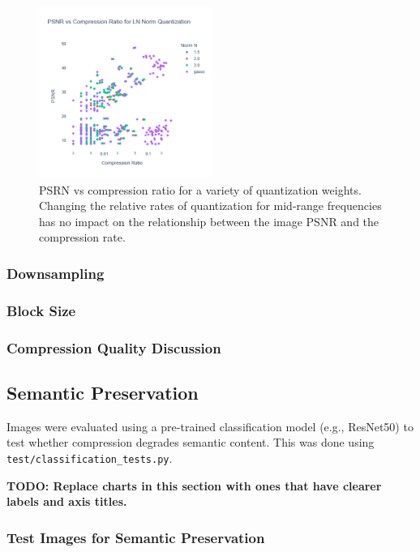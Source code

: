 \begin{figure}
    \includegraphics[width=0.5\textwidth]{assets/PSNR for LN Quantization with gaussian weights.png}
    \caption{PSRN vs compression ratio for a variety of quantization weights. Changing the relative rates of quantization for mid-range frequencies has no impact on the relationship between the image PSNR and the compression rate.}
    \label{fig:LN-norm_quantization_performance}
\end{figure}

\subsubsection{Downsampling}

\subsubsection{Block Size}

\subsubsection{Compression Quality Discussion}


\subsection{Semantic Preservation}
Images were evaluated using a pre-trained classification model (e.g., ResNet50) to test whether compression degrades semantic content. This was done using \texttt{test/classification\_tests.py}.

\textbf{TODO: Replace charts in this section with ones that have clearer labels and axis titles.}

\subsubsection{Test Images for Semantic Preservation}

